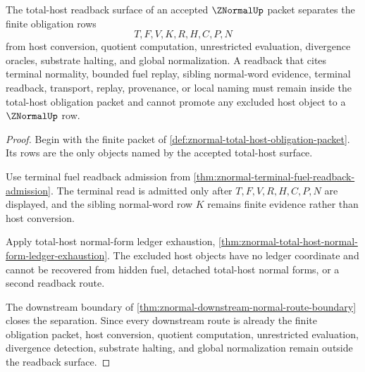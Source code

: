 \begin{theorem}
\label{thm:znormal-total-host-readback-separation}
The total-host readback surface of an accepted $\ZNormalUp$ packet separates the finite obligation rows
$$
T,F,V,K,R,H,C,P,N
$$
from host conversion, quotient computation, unrestricted evaluation, divergence oracles, substrate halting, and global normalization. A readback that cites terminal normality, bounded fuel replay, sibling normal-word evidence, terminal readback, transport, replay, provenance, or local naming must remain inside the total-host obligation packet and cannot promote any excluded host object to a $\ZNormalUp$ row.
\end{theorem}
\begin{proof}
Begin with the finite packet of \autoref{def:znormal-total-host-obligation-packet}. Its rows are the only objects named by the accepted total-host surface.

Use terminal fuel readback admission from \autoref{thm:znormal-terminal-fuel-readback-admission}. The terminal read is admitted only after $T,F,V,R,H,C,P,N$ are displayed, and the sibling normal-word row $K$ remains finite evidence rather than host conversion.

Apply total-host normal-form ledger exhaustion, \autoref{thm:znormal-total-host-normal-form-ledger-exhaustion}. The excluded host objects have no ledger coordinate and cannot be recovered from hidden fuel, detached total-host normal forms, or a second readback route.

The downstream boundary of \autoref{thm:znormal-downstream-normal-route-boundary} closes the separation. Since every downstream route is already the finite obligation packet, host conversion, quotient computation, unrestricted evaluation, divergence detection, substrate halting, and global normalization remain outside the readback surface.
\end{proof}

